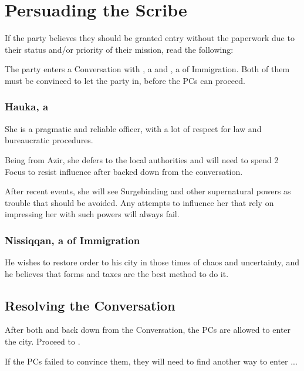 \section{Persuading the Scribe}
\label{sec:scribePersuasion}

If the party believes they should be granted entry without the paperwork due to their status and/or priority of their mission, read the following:


The party enters a Conversation with \npcHauka{}, a \enemyGuardC{} and \npcNissiqqan{}, a \enemyScribeB{} of Immigration. Both of them must be convinced to let the party in, before the PCs can proceed.


\subsubsection{Hauka, a \enemyGuardNameC{}}

She is a pragmatic and reliable officer, with a lot of respect for law and bureaucratic procedures. 

Being from Azir, she defers to the local authorities and will need to spend 2 Focus to resist influence after \enemyScribeB{} backed down from the conversation.

After recent events, she will see Surgebinding and other supernatural powers as trouble that should be avoided. Any attempts to influence her that rely on impressing her with such powers will always fail.



\subsubsection{Nissiqqan, a \enemyScribeNameB{} of Immigration}

He wishes to restore order to his city in those times of chaos and uncertainty, and he believes that forms and taxes are the best method to do it.




\subsection{Resolving the Conversation}

After both \npcHauka{} and \npcNissiqqan{} back down from the Conversation, the PCs are allowed to enter the city. Proceed to .

If the PCs failed to convince them, they will need to find another way to enter \locationYeddaw{}...


